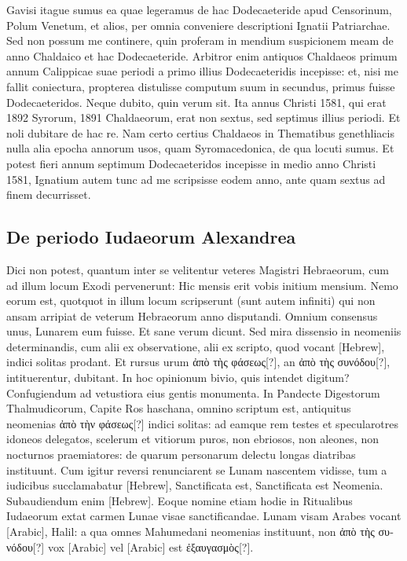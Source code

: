 Gavisi itague sumus ea quae legeramus de hac Dodecaeteride apud
Censorinum, Polum Venetum, et alios, per omnia conveniere descriptioni
Ignatii Patriarchae.
Sed non possum me continere, quin proferam
in mendium suspicionem meam de anno Chaldaico et hac Dodecaeteride.
Arbitror enim antiquos Chaldaeos primum annum
Calippicae suae periodi a primo illius Dodecaeteridis incepisse: et, nisi
me fallit coniectura, propterea distulisse computum suum in secundus,
primus fuisse Dodecaeteridos.
Neque dubito, quin verum sit.
Ita
annus Christi 1581, qui erat 1892 Syrorum, 1891 Chaldaeorum, erat
non sextus, sed septimus illius periodi.
Et noli dubitare de hac re.
Nam
certo certius Chaldaeos in Thematibus genethliacis nulla alia epocha
annorum usos, quam Syromacedonica, de qua locuti sumus.
Et potest fieri annum septimum Dodecaeteridos incepisse in medio anno
Christi 1581, Ignatium autem tunc ad me scripsisse eodem anno, ante
quam sextus ad finem decurrisset.

\subsection{De periodo Iudaeorum Alexandrea}
Dici non potest, quantum inter se velitentur veteres Magistri
Hebraeorum, cum ad illum locum Exodi  pervenerunt:
Hic mensis erit vobis initium mensium.
Nemo eorum est,
quotquot in illum locum scripserunt (sunt autem infiniti) qui non ansam
arripiat de veterum Hebraeorum anno disputandi.
Omnium
consensus unus, Lunarem eum fuisse.
Et sane verum dicunt.
Sed mira
dissensio in neomeniis determinandis, cum alii ex observatione, alii ex
scripto, quod vocant \texthebrew{[Hebrew]}, indici solitas prodant.
Et rursus urum
\textgreek{ἀπὸ τὴς φάσεως[?]}, an \textgreek{ἀπὸ τὴς συνόδου[?]},
 intituerentur, dubitant.
In hoc opinionum bivio, quis intendet digitum?
Confugiendum ad vetustiora
eius gentis monumenta.
In Pandecte Digestorum Thalmudicorum,
Capite Ros haschana, omnino scriptum est, antiquitus
neomenias \textgreek{ἀπὸ τὴν φάσεως[?]} indici solitas: ad eamque rem testes et
specularotres idoneos delegatos, scelerum et vitiorum puros, non
ebriosos, non aleones, non nocturnos praemiatores: de quarum personarum
delectu longas diatribas instituunt.
Cum igitur reversi renunciarent
se Lunam nascentem vidisse, tum a iudicibus succlamabatur
\texthebrew{[Hebrew]}, Sanctificata est, Sanctificata est Neomenia.
Subaudiendum
enim \texthebrew{[Hebrew]}.
Eoque nomine etiam hodie in Ritualibus Iudaeorum
extat carmen Lunae visae sanctificandae.
Lunam visam Arabes
vocant \textarabic{[Arabic]}, Halil: a qua omnes Mahumedani neomenias instituunt,
non \textgreek{ἀπὸ τὴς συνόδου[?]} vox \textarabic{[Arabic]} vel
 \textarabic{[Arabic]} est \textgreek{ἐξαυγασμὸς[?]}.

